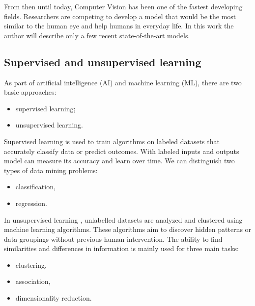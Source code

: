 \documentclass[
]{krantz}
\providecommand{\tightlist}{%
  \setlength{\itemsep}{0pt}\setlength{\parskip}{0pt}}
\begin{document}
From then until today, Computer Vision has been one of the fastest developing fields. Researchers are competing to develop a model that would be the most similar to the human eye and help humans in everyday life. In this work the author will describe only a few recent state-of-the-art models.

\hypertarget{supervised-and-unsupervised-learning}{%
\subsection{Supervised and unsupervised learning}\label{supervised-and-unsupervised-learning}}

As part of artificial intelligence (AI) and machine learning (ML), there are two basic approaches:

\begin{itemize}
\tightlist
\item
  supervised learning;
\item
  unsupervised learning.
\end{itemize}

Supervised learning \citet{supervised} is used to train algorithms on labeled datasets that accurately classify data or predict outcomes. With labeled inputs and outputs model can measure its accuracy and learn over time. We can distinguish two types of data mining problems:

\begin{itemize}
\tightlist
\item
  classification,
\item
  regression.
\end{itemize}

In unsupervised learning \citet{unsupervised}, unlabelled datasets are analyzed and clustered using machine learning algorithms. These algorithms aim to discover hidden patterns or data groupings without previous human intervention. The ability to find similarities and differences in information is mainly used for three main tasks:

\begin{itemize}
\tightlist
\item
  clustering,
\item
  association,
\item
  dimensionality reduction.
\end{itemize}
\end{document}
